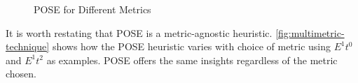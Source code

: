 \begin{figure}
\centering

\caption{POSE for Different Metrics}
\label{fig:multimetric-technique}
\end{figure}

It is worth restating that POSE is a metric-agnostic heuristic. \autoref{fig:multimetric-technique} shows how the POSE heuristic varies with choice of metric using $E^1t^0$ and $E^1t^2$ as examples. POSE offers the same insights regardless of the metric chosen.


